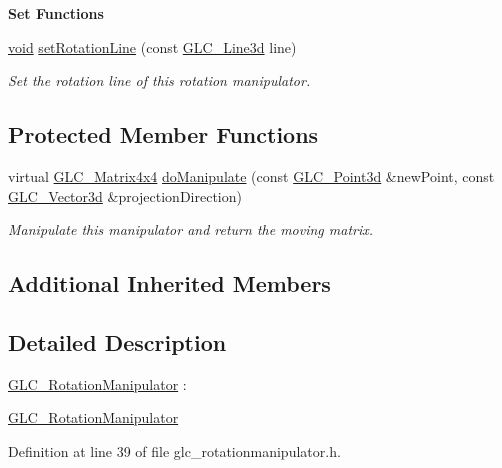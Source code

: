 \begin{Indent}{\bf Set Functions}\par
\begin{DoxyCompactItemize}
\item 
\hyperlink{group___u_a_v_objects_plugin_ga444cf2ff3f0ecbe028adce838d373f5c}{void} \hyperlink{class_g_l_c___rotation_manipulator_addc2ce725151a55791767ea77905f6e3}{set\-Rotation\-Line} (const \hyperlink{class_g_l_c___line3d}{G\-L\-C\-\_\-\-Line3d} line)
\begin{DoxyCompactList}\small\item\em Set the rotation line of this rotation manipulator. \end{DoxyCompactList}\end{DoxyCompactItemize}
\end{Indent}
\subsection*{Protected Member Functions}
\begin{DoxyCompactItemize}
\item 
virtual \hyperlink{class_g_l_c___matrix4x4}{G\-L\-C\-\_\-\-Matrix4x4} \hyperlink{class_g_l_c___rotation_manipulator_adb71dccf7c616c98a49135605395f463}{do\-Manipulate} (const \hyperlink{glc__vector3d_8h_a4e13a9bbc7ab3d34de7e98b41836772c}{G\-L\-C\-\_\-\-Point3d} \&new\-Point, const \hyperlink{class_g_l_c___vector3d}{G\-L\-C\-\_\-\-Vector3d} \&projection\-Direction)
\begin{DoxyCompactList}\small\item\em Manipulate this manipulator and return the moving matrix. \end{DoxyCompactList}\end{DoxyCompactItemize}
\subsection*{Additional Inherited Members}


\subsection{Detailed Description}
\hyperlink{class_g_l_c___rotation_manipulator}{G\-L\-C\-\_\-\-Rotation\-Manipulator} \-: 

\hyperlink{class_g_l_c___rotation_manipulator}{G\-L\-C\-\_\-\-Rotation\-Manipulator} 

Definition at line 39 of file glc\-\_\-rotationmanipulator.\-h.



